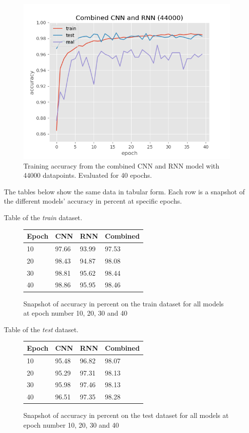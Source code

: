 \begin{figure}[H]
    \centering
    \includegraphics[width=.8\linewidth]{Assets/Chapter4_Result/Combined_CNN_and_RNN_40_epoch.png}
    \caption{Training accuracy from the combined CNN and RNN model with 44000 datapoints. Evaluated for 40 epochs.}
    \label{fig:combined_CNN_RNN_44000}
\end{figure}

The tables below show the same data in tabular form. Each row is a snapshot of the different models' accuracy in percent at specific epochs. 

Table of the \textit{train} dataset.
\begin{figure}[H]
    \centering
        \begin{tabular}{| p{2cm} | p{3cm} | p{3cm} | p{3cm} |}
    \hline
    Epoch & \textbf{CNN} & \textbf{RNN} & \textbf{Combined} \\ \hline
    10 & 97.66 & 93.99 & 97.53 \\ \hline
    20 & 98.43 & 94.87 & 98.08 \\ \hline
    30 & 98.81 & 95.62 & 98.44 \\ \hline
    40 & 98.86 & 95.95 & 98.46 \\ \hline
    \end{tabular}
    \caption{Snapshot of accuracy in percent on the train dataset for all models at epoch number 10, 20, 30 and 40}

    \label{fig:table_train_dataset}
\end{figure}

Table of the \textit{test} dataset.
\begin{figure}[H]
    \centering
    \begin{tabular}{| p{2cm} | p{3cm} | p{3cm} | p{3cm} |}
    \hline
    Epoch & \textbf{CNN} & \textbf{RNN} & \textbf{Combined} \\ \hline
    10 & 95.48 & 96.82 & 98.07 \\ \hline
    20 & 95.29 & 97.31 & 98.13 \\ \hline
    30 & 95.98 & 97.46 & 98.13 \\ \hline
    40 & 96.51 & 97.35 & 98.28 \\ \hline
    \end{tabular}
    \caption{Snapshot of accuracy in percent on the test dataset for all models at epoch number 10, 20, 30 and 40}
    \label{fig:table_test_dataset}

\end{figure}

